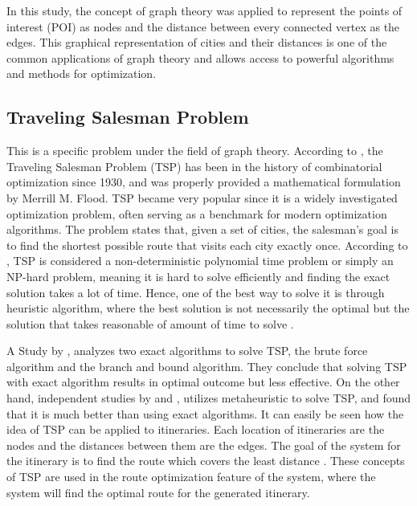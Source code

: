 In this study, the concept of graph theory was applied to represent the points of interest (POI) as nodes and the distance between every connected vertex as the edges. This graphical representation of cities and their distances is one of the common applications of graph theory and allows access to powerful algorithms and methods for optimization.

\subsection{Traveling Salesman Problem}

This is a specific problem under the field of graph theory. According to \textcite{Pop2024}, the Traveling Salesman Problem (TSP) has been in the history of combinatorial optimization since 1930, and was properly provided a mathematical formulation by Merrill M. Flood. TSP became very popular since it is a widely investigated optimization problem, often serving as a benchmark for modern optimization algorithms. The problem states that, given a set of cities, the salesman’s goal is to find the shortest possible route that visits each city exactly once.  According to \textcite{Wu2020}, TSP is considered a non-deterministic polynomial time problem or simply an NP-hard problem, meaning it is hard to solve efficiently and finding the exact solution takes a lot of time. Hence, one of the best way to solve it is through heuristic algorithm, where the best solution is not necessarily the optimal but the solution that takes reasonable of amount of time to solve \parencite{Sabery2023}.

A Study by \textcite{Violina2021}, analyzes two exact algorithms to solve TSP, the brute force algorithm and the branch and bound algorithm. They conclude that solving TSP with exact algorithm results in optimal outcome but less effective. On the other hand, independent studies by \textcite{Wu2020} and \textcite{Wadi2025}, utilizes metaheuristic to solve TSP, and found that it is much better than using exact algorithms. It can easily be seen how the idea of TSP can be applied to itineraries. Each location of itineraries are the nodes and the distances between them are the edges. The goal of the system for the itinerary is to find the route which covers the least distance \parencite{Pop2024}. These concepts of TSP are used in the route optimization feature of the system, where the system will find the optimal route for the generated itinerary.

